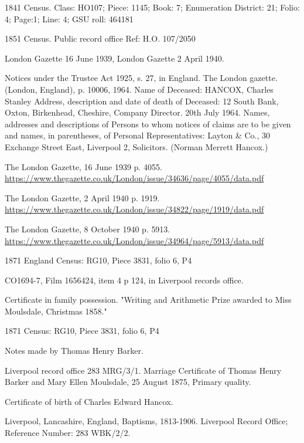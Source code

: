 \begin{thebibliography}{99}
	1841 Census.
	Class: HO107; Piece: 1145; Book: 7; Enumeration District: 21; Folio: 4; Page:1; Line: 4; GSU roll: 464181
	
	1851 Census.
	Public record office Ref: H.O. 107/2050
	
	London Gazette 16 June 1939, London Gazette 2 April 1940.
	
	Notices under the Trustee Act 1925, s. 27, in England. The London gazette. (London, England), p. 10006, 1964.
	Name of Deceased: HANCOX, Charles Stanley
	Address, description and date of death of Deceased:
	12 South Bank, Oxton, Birkenhead, Cheshire, Company Director. 20th July 1964.
	Names, addresses and descriptions of Persons to whom notices of claims are to be given and names, in parentheses, of Personal Representatives:
	Layton \& Co., 30 Exchange Street East, Liverpool 2, Solicitors. (Norman Merrett Hancox.)

	The London Gazette, 16 June 1939 p. 4055.
	\url{https://www.thegazette.co.uk/London/issue/34636/page/4055/data.pdf}
	
	The London Gazette, 2 April 1940 p. 1919.
	\url{https://www.thegazette.co.uk/London/issue/34822/page/1919/data.pdf}

	The London Gazette, 8 October 1940 p. 5913.
	\url{https://www.thegazette.co.uk/London/issue/34964/page/5913/data.pdf}
	
	1871 England Census: RG10, Piece 3831, folio 6, P4
	
	CO1694-7, Film 1656424, item 4 p 124, in Liverpool records office. 
	
	Certificate in family possession.
	"Writing and Arithmetic Prize awarded to Miss Moulsdale, Christmas 1858."
	
	1871 Census: RG10, Piece 3831, folio 6, P4 
	
	Notes made by Thomas Henry Barker. 
	
	Liverpool record office 283 MRG/3/1.
	Marriage Certificate of Thomas Henry Barker and Mary Ellen Moulsdale, 25 August 1875, Primary quality. 
	
	Certificate of birth of Charles Edward Hancox. 


	Liverpool, Lancashire, England, Baptisms, 1813-1906.
	Liverpool Record Office; Reference Number: 283 WBK/2/2.
	

\end{thebibliography}
